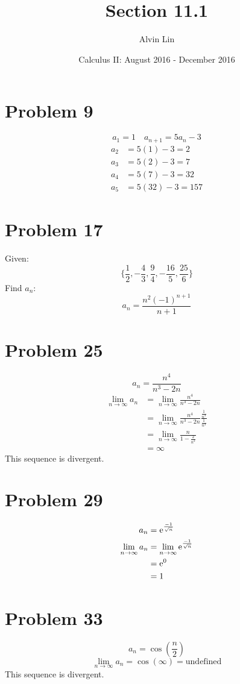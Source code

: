 \documentclass[letterpaper, 12pt]{math}
\title{Section 11.1}
\author{Alvin Lin}
\date{Calculus II: August 2016 - December 2016}
\begin{document}
\maketitle

\section*{Problem 9}
\[ a_{1} = 1 \quad a_{n+1} = 5a_{n}-3 \]
\begin{align*}
  a_{2} &= 5(1)-3 = 2 \\
  a_{3} &= 5(2)-3 = 7 \\
  a_{4} &= 5(7)-3 = 32 \\
  a_{5} &= 5(32)-3 = 157
\end{align*}

\section*{Problem 17}
Given:
\[ \bigg\{\frac{1}{2},-\frac{4}{3},
   \frac{9}{4},-\frac{16}{5},\frac{25}{6}\bigg\} \]
Find \( a_{n} \):
\[ a_{n} = \frac{n^{2}(-1)^{n+1}}{n+1} \]

\section*{Problem 25}
\[ a_{n} = \frac{n^{4}}{n^{3}-2n} \]
\begin{align*}
  \lim_{n\to\infty}{a_{n}} &= \lim_{n\to\infty}{\frac{n^{4}}{n^{3}-2n}} \\
  &= \lim_{n\to\infty}{\frac{n^{4}}{n^{3}-2n}
    \frac{\frac{1}{n^{3}}}{\frac{1}{n^{3}}}} \\
  &= \lim_{n\to\infty}{\frac{n}{1-\frac{2}{n^{2}}}} \\
  &= \infty
\end{align*}
This sequence is divergent.

\section*{Problem 29}
\[ a_{n} = \mathrm{e}^{\frac{-1}{\sqrt{n}}} \]
\begin{align*}
  \lim_{n\to\infty}{a_{n}} &= \lim_{n\to\infty}{\mathrm{e}^{\frac{-1}{\sqrt{n}}}} \\
  &= \mathrm{e}^{0} \\
  &= 1
\end{align*}

\section*{Problem 33}
\[ a_{n} = \cos(\frac{n}{2}) \]
\[ \lim_{n\to\infty}{a_{n}} = \cos(\infty) = \mathrm{undefined} \]
This sequence is divergent.
\end{document}
